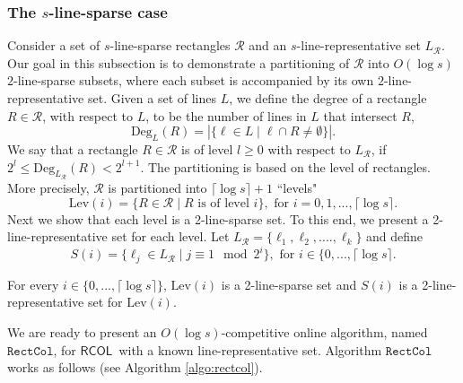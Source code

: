 \documentclass[a4paper,UKenglish]{lipics-v2016}
\newcommand{\rcol}{\mbox{$\mathsf{RCOL}$}}
\theoremstyle{plain}
\newcommand{\cR}{\mathcal{R}}
\newcommand{\algrcol}{\mathtt{RectCol}}
\begin{document}
 

\subsubsection{The $s$-line-sparse case}\label{subsub:ssp}
Consider a set of $s$-line-sparse rectangles $\cR$ and an $s$-line-representative set $L_{\cR}$. Our goal in this subsection is to demonstrate a partitioning of $\cR$ into $O(\log s)$ $2$-line-sparse subsets, where each subset is accompanied by its own $2$-line-representative set.
%
Given a set of lines $L$, we define the degree of a rectangle $R\in\cR$, with respect to $L$, to be the number of lines in $L$ that intersect $R$,
\[ \mathrm{Deg}_{L}(R)=\left| \{ \ell\in L \mid \ell\cap R\neq\emptyset \}\right|. \]
We say that a rectangle $R\in\cR$ is of level $l\geq 0$ with respect to $L_\cR$, if 
$2^l\leq \mathrm{Deg}_{L_{\cR}}(R)<2^{l+1}$. The partitioning is based on the level of rectangles. More precisely, $\cR$ is partitioned into $\lceil \log s\rceil+1$ ``levels"
\[\mathrm{Lev}(i)=\{ R\in\cR \mid R \mbox{ is of level } i \}, \mbox{ for } i=0,1,...,\lceil \log s\rceil.\]
%
Next we show that each level is a 2-line-sparse set. To this end, we present a 2-line-representative set for each level. Let $L_\cR=\{\ell_1,\ell_2,....,\ell_k\}$ and define 
\[S(i)=\{ \ell_j\in L_{\cR} \mid j \equiv 1 \mod 2^i \}, \text{ for } i\in\{0,...,\lceil \log s\rceil.\]

\begin{lemma}
For every $i\in\{0,...,\lceil \log s\rceil\}$, $\mathrm{Lev}(i)$ is a 2-line-sparse set and $S(i)$ is a 2-line-representative set for $\mathrm{Lev}(i)$.
\label{lemma: crlevel is 2-line-sparse}
\end{lemma}

We are ready to present an $O(\log s)$-competitive online algorithm, named $\mathtt{RectCol}$, for \rcol\  with a known line-representative set.
%
Algorithm $\algrcol$ works as follows (see Algorithm \ref{algo:rectcol}).
\end{document}

